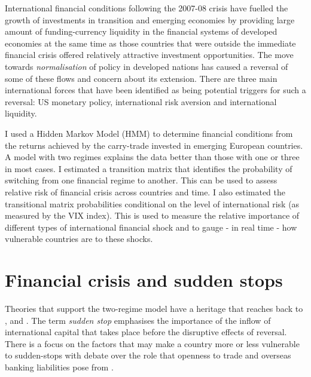 \documentclass[12pt, a4paper, oneside]{article} %
\begin{document}

International financial conditions following the 2007-08 crisis have fuelled the growth of investments in transition and emerging economies by providing large amount of funding-currency liquidity in the financial systems of developed economies at the same time as those countries that were outside the immediate financial crisis offered relatively attractive investment opportunities.   The move towards \emph{normalisation} of policy in developed nations has caused a reversal of some of these flows and concern about its extension.  There are three main international forces that have been identified as being potential triggers for such a reversal:  US monetary policy, international risk aversion and international liquidity. 

I used a Hidden Markov Model (HMM) to determine financial conditions from the returns achieved by the carry-trade invested in emerging European countries. A model with two regimes explains the data better than those with one or three in most cases.  I estimated a transition matrix that identifies the probability of switching from one financial regime to another. This can be used to assess relative risk of financial crisis across countries and time.  I also estimated the transitional matrix probabilities conditional on the level of international risk (as measured by the VIX index).  This is used to measure the relative importance of different types of international financial shock and to gauge - in real time - how vulnerable countries are to these shocks. %

\section{Financial crisis and sudden stops}
Theories that support the two-regime model have a heritage that reaches back to \citet{DornbuschSS}, \citet{CalvoSS} and \citet{KrugmanSS}.  The term \emph{sudden stop} emphasises the importance of the inflow of international capital that takes place before the disruptive effects of reversal.  There is a focus on the factors that may make a country more or less vulnerable to sudden-stops with debate over the role that openness to trade \citet{Cavallo20081430} and overseas banking liabilities pose from \citet{calvo2004empiric}.   
 
\end{document}
